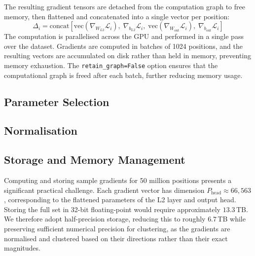 The resulting gradient tensors are detached from the computation graph to free memory, then flattened and concatenated into a single vector per position:
\[
\Delta_i = \mathrm{concat}\left[\mathrm{vec}(\nabla_{W_{L2}} \mathcal{L}_i),\; \nabla_{b_{L2}} \mathcal{L}_i,\; \mathrm{vec}(\nabla_{W_{\mathrm{out}}} \mathcal{L}_i),\; \nabla_{b_{\mathrm{out}}} \mathcal{L}_i\right]
\]
The computation is parallelised across the GPU and performed in a single pass over the dataset. Gradients are computed in batches of 1024 positions, and the resulting vectors are accumulated on disk rather than held in memory, preventing memory exhaustion. The \texttt{retain\_graph=False} option ensures that the computational graph is freed after each batch, further reducing memory usage.

\subsection{Parameter Selection}\label{sec:grad-params}


\subsection{Normalisation}\label{sec:grad-norm}


\subsection{Storage and Memory Management}\label{sec:grad-storage}

Computing and storing sample gradients for 50 million positions presents a significant practical challenge. Each gradient vector has dimension \(P_{\mathrm{head}} \approx 66{,}563\), corresponding to the flattened parameters of the L2 layer and output head. Storing the full set in 32-bit floating-point would require approximately \(13.3\)\,TB. We therefore adopt half-precision storage, reducing this to roughly \(6.7\)\,TB while preserving sufficient numerical precision for clustering, as the gradients are normalised and clustered based on their directions rather than their exact magnitudes.

